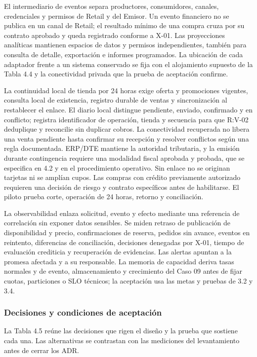 \documentclass[11pt]{article}
\begin{document}
El intermediario de eventos separa productores, consumidores, canales, credenciales y permisos de Retail y del Emisor. Un evento financiero no se publica en un canal de Retail; el resultado mínimo de una compra cruza por su contrato aprobado y queda registrado conforme a X-01. Las proyecciones analíticas mantienen espacios de datos y permisos independientes, también para consulta de detalle, exportación e informes programados. La ubicación de cada adaptador frente a un sistema conservado se fija con el alojamiento supuesto de la Tabla 4.4 y la conectividad privada que la prueba de aceptación confirme.

La continuidad local de tienda por 24 horas exige oferta y promociones vigentes, consulta local de existencia, registro durable de ventas y sincronización al restablecer el enlace. El diario local distingue pendiente, enviado, confirmado y en conflicto; registra identificador de operación, tienda y secuencia para que R:V-02 deduplique y reconcilie sin duplicar cobros. La conectividad recuperada no libera una venta pendiente hasta confirmar su recepción y resolver conflictos según una regla documentada. ERP/DTE mantiene la autoridad tributaria, y la emisión durante contingencia requiere una modalidad fiscal aprobada y probada, que se especifica en 4.2 y en el procedimiento operativo. Sin enlace no se originan tarjetas ni se amplían cupos. Las compras con crédito previamente autorizado requieren una decisión de riesgo y contrato específicos antes de habilitarse. El piloto prueba corte, operación de 24 horas, retorno y conciliación.

La observabilidad enlaza solicitud, evento y efecto mediante una referencia de correlación sin exponer datos sensibles. Se miden retraso de publicación de disponibilidad y precio, confirmaciones de reserva, pedidos sin avance, eventos en reintento, diferencias de conciliación, decisiones denegadas por X-01, tiempo de evaluación crediticia y recuperación de evidencias. Las alertas apuntan a la promesa afectada y a su responsable. La memoria de capacidad deriva tasas normales y de evento, almacenamiento y crecimiento del Caso 09 antes de fijar cuotas, particiones o SLO técnicos; la aceptación usa las metas y pruebas de 3.2 y 3.4.

\subsubsection{Decisiones y condiciones de aceptación}

La Tabla 4.5 reúne las decisiones que rigen el diseño y la prueba que sostiene cada una. Las alternativas se contrastan con las mediciones del levantamiento antes de cerrar los ADR.
\end{document}

